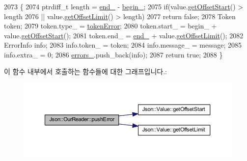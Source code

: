 \begin{DoxyCode}
2073                                                                            \{
2074   ptrdiff\_t length = \hyperlink{class_json_1_1_our_reader_ab1f69b0260c27a0d2d65dc56e42c8f9d}{end\_} - \hyperlink{class_json_1_1_our_reader_a9bda9d72335d52cd06e65f9eca3f70f5}{begin\_};
2075   \textcolor{keywordflow}{if}(value.\hyperlink{class_json_1_1_value_afa081dc764000951a1d8d6148155508e}{getOffsetStart}() > length
2076     || value.\hyperlink{class_json_1_1_value_a2cdfa01935f87fcace90d450cbd2c0a4}{getOffsetLimit}() > length)
2077     \textcolor{keywordflow}{return} \textcolor{keyword}{false};
2078   Token token;
2079   token.type\_ = \hyperlink{class_json_1_1_our_reader_a15116f7276ddf1e7a2cc3cbefa884dccad39f929b971de8dc55fe84a2d2e3465e}{tokenError};
2080   token.start\_ = begin\_ + value.\hyperlink{class_json_1_1_value_afa081dc764000951a1d8d6148155508e}{getOffsetStart}();
2081   token.end\_ = \hyperlink{class_json_1_1_our_reader_ab1f69b0260c27a0d2d65dc56e42c8f9d}{end\_} + value.\hyperlink{class_json_1_1_value_a2cdfa01935f87fcace90d450cbd2c0a4}{getOffsetLimit}();
2082   ErrorInfo info;
2083   info.token\_ = token;
2084   info.message\_ = message;
2085   info.extra\_ = 0;
2086   \hyperlink{class_json_1_1_our_reader_afb76b68ba1ab68fe09cf2838e3d4898d}{errors\_}.push\_back(info);
2087   \textcolor{keywordflow}{return} \textcolor{keyword}{true};
2088 \}
\end{DoxyCode}
이 함수 내부에서 호출하는 함수들에 대한 그래프입니다.\+:\nopagebreak
\begin{figure}[H]
\begin{center}
\leavevmode
\includegraphics[width=350pt]{class_json_1_1_our_reader_a700e9d8e0977fa7e0375d26690d7025f_cgraph}
\end{center}
\end{figure}
\mbox{\label{class_json_1_1_our_reader_addccecfca74b79adaad6115ddd614477}} 
